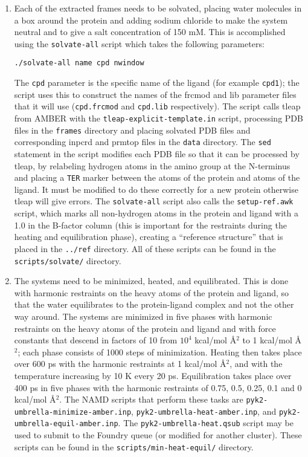 \documentclass{article}      %
\begin{document}
\begin{enumerate}
\item Each of the extracted frames needs to be solvated, placing water molecules in a box around the protein and adding sodium chloride to make the system neutral and to give a salt concentration of 150 mM.  This is accomplished using the \verb+solvate-all+ script which takes the following parameters:
\begin{verbatim}
./solvate-all name cpd nwindow
\end{verbatim}
The \verb+cpd+ parameter is the specific name of the ligand (for example \verb+cpd1+); the script uses this to construct the names of the frcmod and lib parameter files that it will use (\verb+cpd.frcmod+ and \verb+cpd.lib+ respectively).  The script calls tleap from AMBER with the \verb+tleap-explicit-template.in+ script, processing PDB files in  the \verb+frames+ directory and placing solvated PDB files and corresponding inpcrd and prmtop files in the \verb+data+ directory.  The \verb+sed+ statement in the script modifies each PDB file so that it can be processed by tleap, by relabeling hydrogen atoms in the amino group at the N-terminus and placing a \verb+TER+ marker between the atoms of the protein and atoms of the ligand.  It must be modified to do these correctly for a new protein otherwise tleap will give errors.  The \verb+solvate-all+ script also calls the \verb+setup-ref.awk+ script, which marks all non-hydrogen atoms in the protein and ligand with a 1.0 in the B-factor column (this is important for the restraints during the heating and equilibration phase), creating a ``reference structure'' that is placed in the \verb+../ref+ directory.  All of these scripts can be found in the \verb+scripts/solvate/+ directory.

\item The systems need to be minimized, heated, and equilibrated.  This is done with harmonic restraints on the heavy atoms of the protein and ligand, so that the water equilibrates to the protein-ligand complex and not the other way around.  The systems are minimized in five phases with harmonic restraints on the heavy atoms of the protein and ligand and with force constants that descend in factors of 10 from $10^4$ kcal/mol \AA${}^2$ to 1 kcal/mol \AA${}^2$; each phase consists of 1000 steps of minimization.  Heating then takes place over 600 ps with the harmonic restraints at 1 kcal/mol \AA${}^2$, and with the temperature increasing by 10 K every 20 ps.  Equilibration takes place over 400 ps in five phases with the harmonic restraints of 0.75, 0.5, 0.25, 0.1 and 0 kcal/mol \AA${}^2$. The NAMD scripts  that perform these tasks are \verb+pyk2-umbrella-minimize-amber.inp+, \verb+pyk2-umbrella-heat-amber.inp+, and \verb+pyk2-umbrella-equil-amber.inp+.   The \verb+pyk2-umbrella-heat.qsub+ script may be used to submit to the Foundry queue (or modified for another cluster).  These scripts can be found in the \verb+scripts/min-heat-equil/+ directory.


\end{enumerate}
\end{document}
